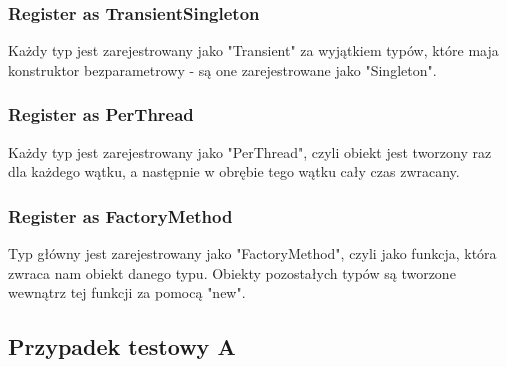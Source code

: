 \documentclass[12pt]{article}
\begin{document}
\subsubsection{Register as TransientSingleton}
Każdy typ jest zarejestrowany jako "Transient" za wyjątkiem typów, które maja konstruktor bezparametrowy - są one zarejestrowane jako "Singleton".

\subsubsection{Register as PerThread}
Każdy typ jest zarejestrowany jako "PerThread", czyli obiekt jest tworzony raz dla każdego wątku, a następnie w obrębie tego wątku cały czas zwracany.

\subsubsection{Register as FactoryMethod}
Typ główny jest zarejestrowany jako "FactoryMethod", czyli jako funkcja, która zwraca nam obiekt danego typu. Obiekty pozostałych typów są tworzone wewnątrz tej funkcji za pomocą "new".


\subsection{Przypadek testowy A}
\end{document}
